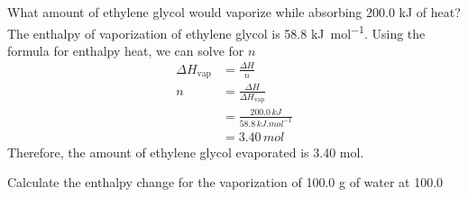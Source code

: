 \begin{sample}{What amount of ethylene glycol would vaporize while absorbing 200.0 kJ of heat?}
    The enthalpy of vaporization of ethylene glycol is 58.8 \si{kJ.mol^{-1}}. Using the formula
    for enthalpy heat, we can solve for $n$
    \begin{align*}
        \Delta H_\text{vap}&=\frac{\Delta H}{n}\\
        n&=\frac{\Delta H}{\Delta H_\text{vap}}\\
         &=\frac{200.0\,\si{kJ}}{58.8\,\si{kJ.mol^{-1}}}\\
         &=3.40\,\si{mol}
    \end{align*}
    Therefore, the amount of ethylene glycol evaporated is 3.40 mol.
\end{sample}

\begin{sample}{Calculate the enthalpy change for the vaporization of 100.0 g of water at 100.0 }
\end{sample}
